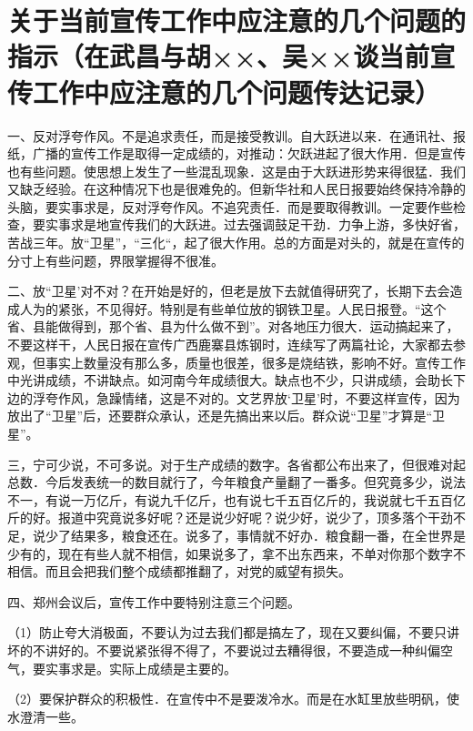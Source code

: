 \section[关于当前宣传工作中应注意的几个问题的指示（在武昌与胡××、吴××谈当前宣传工作中应注意的几个问题传达记录）（一九五八年十二月六日）]{关于当前宣传工作中应注意的几个问题的指示（在武昌与胡××、吴××谈当前宣传工作中应注意的几个问题传达记录）}


一、反对浮夸作风。不是追求责任，而是接受教训。自大跃进以来．在通讯社、报纸，广播的宣传工作是取得一定成绩的，对推动：欠跃进起了很大作用．但是宣传也有些问题。使思想上发生了一些混乱现象．这是由于大跃进形势来得很猛．我们又缺乏经验。在这种情况下也是很难免的。但新华社和人民日报要始终保持冷静的头脑，要实事求是，反对浮夸作风。不追究责任．而是要取得教训。一定要作些检查，要实事求是地宣传我们的大跃进。过去强调鼓足干劲．力争上游，多快好省，苦战三年。放“卫星”，“三化“，起了很大作用。总的方面是对头的，就是在宣传的分寸上有些问题，界限掌握得不很准。

二、放“卫星’对不对？在开始是好的，但老是放下去就值得研究了，长期下去会造成人为的紧张，不见得好。特别是有些单位放的钢铁卫星。人民日报登。“这个省、县能做得到，那个省、县为什么做不到”。对各地压力很大．运动搞起来了，不要这样干，人民日报在宣传广西鹿寨县炼钢时，连续写了两篇社论，大家都去参观，但事实上数量没有那么多，质量也很差，很多是烧结铁，影响不好。宣传工作中光讲成绩，不讲缺点。如河南今年成绩很大。缺点也不少，只讲成绩，会助长下边的浮夸作风，急躁情绪，这是不对的。文艺界放‘卫星’时，不要这样宣传，因为放出了“卫星”后，还要群众承认，还是先搞出来以后。群众说“卫星”才算是“卫星”。

三，宁可少说，不可多说。对于生产成绩的数字。各省都公布出来了，但很难对起总数．今后发表统一的数目就行了，今年粮食产量翻了一番多。但究竟多少，说法不一，有说一万亿斤，有说九千亿斤，也有说七千五百亿斤的，我说就七千五百亿斤的好。报道中究竟说多好呢？还是说少好呢？说少好，说少了，顶多落个干劲不足，说少了结果多，粮食还在。说多了，事情就不好办．粮食翻一番，在全世界是少有的，现在有些人就不相信，如果说多了，拿不出东西来，不单对你那个数字不相信。而且会把我们整个成绩都推翻了，对党的威望有损失。

四、郑州会议后，宣传工作中要特别注意三个问题。

（1）防止夸大消极面，不要认为过去我们都是搞左了，现在又要纠偏，不要只讲坏的不讲好的。不要说紧张得不得了，不要说过去糟得很，不要造成一种纠偏空气，要实事求是。实际上成绩是主要的。

（2）要保护群众的积极性．在宣传中不是要泼冷水。而是在水缸里放些明矾，使水澄清一些。

